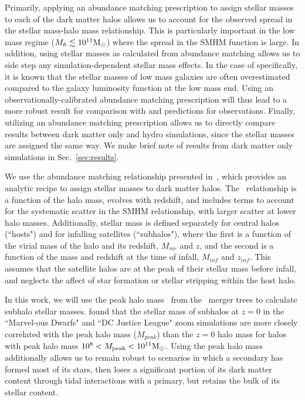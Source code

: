\documentclass[twocolumn]{aastex631}
\begin{document}
    Primarily, applying an abundance matching prescription to assign stellar masses to each of the dark matter halos allows us to account for the observed spread in the stellar mass-halo mass relationship. 
    This is particularly important in the low mass regime ($M_h \lesssim 10^{11}\mathrm{M}_\odot$) where the spread in the SMHM function is large. 
    In addition, using stellar masses as calculated from abundance matching allows us to side step any simulation-dependent stellar mass effects.
    In the case of  specifically, it is known that the stellar masses of low mass galaxies are often overestimated compared to the galaxy luminosity function at the low mass end\cite{}. 
    Using an observationally-calibrated abundance matching prescription will thus lead to a more robust result for comparison with and predictions for observations. 
    Finally, utilizing an abundance matching prescription allows us to directly compare results between dark matter only and hydro simulations, since the stellar masses are assigned the same way. 
    We make brief note of results from dark matter only simulations in Sec.~\ref{sec:results}.
    
    We use the abundance matching relationship presented in~\citet{Moster2013}, which provides an analytic recipe to assign stellar masses to dark matter halos. 
    The~\citet{Moster2013} relationship is a function of the halo mass, evolves with redshift, and includes terms to account for the systematic scatter in the SMHM relationship, with larger scatter at lower halo masses.
    Additionally, stellar mass is defined separately for central halos (``hosts") and for infalling satellites (``subhalos"), where the first is a function of the virial mass of the halo and its redshift, $M_{vir}$ and $z$, and the second is a function of the mass and redshift at the time of infall, $M_{inf}$ and $z_{inf}$. 
    This assumes that the satellite halos are at the peak of their stellar mass before infall, and neglects the affect of star formation or stellar stripping within the host halo. 

    In this work, we will use the peak halo mass \Mpeak\ from the \sublink\ merger trees to calculate subhalo stellar masses. 
    \citet{Munshi2021} found that the stellar mass of subhalos at $z=0$ in the ``Marvel-ous Dwarfs" and ``DC Justice League" zoom simulations are more closely correlated with the peak halo mass ($M_{peak}$) than the $z=0$ halo mass for halos with peak halo mass $10^8<M_{\rm peak}<10^{11} \mathrm{M}_\odot$. 
    Using the peak halo mass additionally allows us to remain robust to scenarios in which a secondary has formed most of its stars, then loses a significant portion of its dark matter content through tidal interactions with a primary, but retains the bulk of its stellar content.
        
\end{document}
